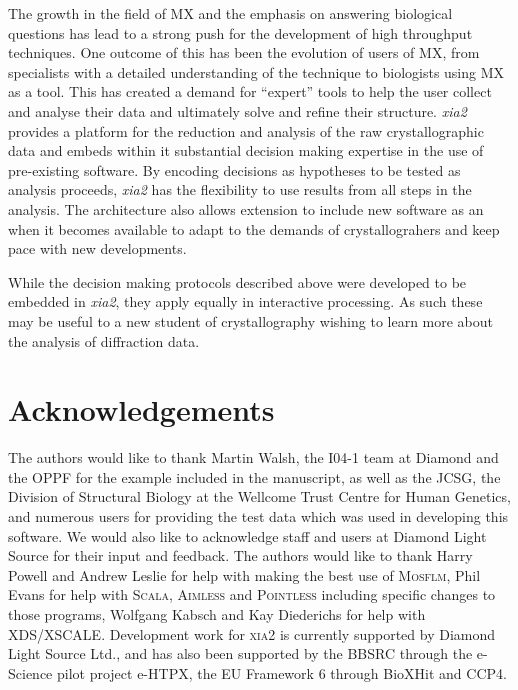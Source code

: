 \documentclass[preprint,pdf]{iucr}
\begin{document}
The growth in the field of MX and the emphasis on answering biological
questions has lead to a strong push for the development of high
throughput techniques. One outcome of this has been the evolution of
users of MX, from specialists with a detailed understanding of the
technique to biologists using MX as a tool. This has created a demand
for ``expert'' tools to help the user collect and analyse their data
and ultimately solve and refine their structure. \emph{xia2} provides
a platform for the reduction and analysis of the raw crystallographic
data and embeds within it substantial decision making expertise in the
use of pre-existing software. By encoding
decisions as hypotheses to be tested as analysis proceeds, \emph{xia2}
has the flexibility to use results from all steps in the analysis. The
architecture also allows extension to include new software as an when
it becomes available to adapt to the demands of crystallograhers and
keep pace with new developments.

While the decision making protocols described above were developed to
be embedded in \emph{xia2}, they apply equally in interactive
processing. As such these may be useful to a new student of
crystallography wishing to learn more about the analysis of
diffraction data.

\section{Acknowledgements}

The authors would like to thank Martin Walsh, the I04-1 team at
Diamond  and the OPPF for the
example included in the manuscript, as well as
the JCSG, the Division of Structural Biology at
the Wellcome Trust Centre for Human Genetics,
and numerous users for providing the test data which was used in 
developing this software. We would also like to acknowledge staff and users 
at Diamond Light Source for their input and feedback.
The authors would like to thank Harry Powell
and Andrew Leslie for help with making the best use of \textsc{Mosflm},
Phil Evans for help with \textsc{Scala}, \textsc{Aimless} and
\textsc{Pointless} including  
specific changes to those programs, Wolfgang Kabsch and Kay Diederichs
for help with XDS/XSCALE. 
Development work for \textsc{xia2} is currently supported by Diamond
Light Source Ltd., and has also been supported by the BBSRC
through the e-Science pilot project e-HTPX, the EU Framework 6 through 
BioXHit and CCP4.
\end{document}
